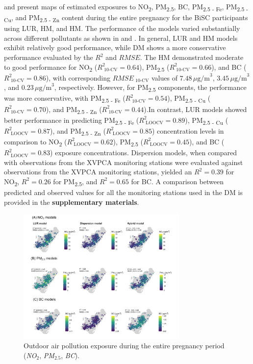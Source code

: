 \documentclass{article}
\begin{document}
 and  present maps of estimated exposures to NO\textsubscript{2}, PM\textsubscript{2.5}, BC, PM\textsubscript{2.5 - Fe}, PM\textsubscript{2.5 - Cu}, and PM\textsubscript{2.5 - Zn} content  during the entire pregnancy for the BiSC participants using LUR, HM, and HM. The performance of the models varied substantially across different pollutants as shown in  and . In general, LUR and HM models exhibit relatively good performance, while DM shows a more conservative performance evaluated by the $R^{2}$ and $RMSE$. The HM demonstrated moderate to good performance for NO\textsubscript{2} ($R^{2}_{\text{ 10-CV}} = 0.64$), PM\textsubscript{2.5} ($R^{2}_{\text{ 10-CV}} = 0.66$), and BC ($R^{2}_{\text{ 10-CV}} = 0.86$), with corresponding $RMSE_{\text{ 10-CV}}$ values of $7.48 \, \mu\text{g/m}^{3}$, $3.45 \, \mu\text{g/m}^{3}$, and $0.23 \, \mu\text{g/m}^{3}$, respectively. However, for PM\textsubscript{2.5} components, the performance was more conservative, with PM\textsubscript{2.5 - Fe} ($R^{2}_{\text{ 10-CV}} = 0.54$), PM\textsubscript{2.5 - Cu} ($R^{2}_{\text{ 10-CV}} = 0.70$), and PM\textsubscript{2.5 - Zn} ($R^{2}_{\text{ 10-CV}} = 0.44$).In contrast, LUR models showed better performance in predicting PM\textsubscript{2.5 - Fe} ($R^{2}_{\text{ LOOCV}} = 0.89$), PM\textsubscript{2.5 - Cu} ($R^{2}_{\text{ LOOCV}} = 0.87$), and PM\textsubscript{2.5 - Zn} ($R^{2}_{\text{ LOOCV}} = 0.85$) concentration levels in comparison to  NO\textsubscript{2} ($R^{2}_{\text{ LOOCV}} = 0.62$), PM\textsubscript{2.5} ($R^{2}_{\text{ LOOCV}} = 0.45$), and BC ($R^{2}_{\text{ LOOCV}} = 0.83$) exposure concentrations. Dispersion models, when compared with observations from the XVPCA monitoring stations were evaluated against observations from the XVPCA monitoring stations, yielded an $R^{2} = 0.39$ for NO\textsubscript{2}, $R^{2} = 0.26$ for PM\textsubscript{2.5}, and $R^{2} = 0.65$ for BC. A comparison between predicted and observed values for all the monitoring stations used in the DM is provided in the \textbf{supplementary materials}. 

\captionsetup[figure]{skip=4pt} %
\begin{figure}[!h]
\includegraphics[width=0.75\textwidth]{figures/combined_figure1_v2.png}
\caption{Outdoor air pollution exposure during the entire pregnancy period (\textit{NO$_2$}, \textit{PM$_{2.5}$}, \textit{BC}).}
\label{fig2}
\end{figure}
\end{document}
